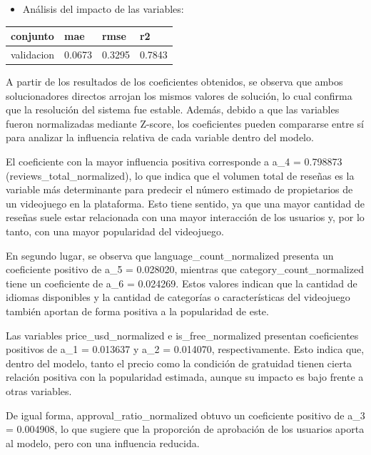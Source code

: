 \documentclass[12pt]{report}
\begin{document}
\begin{itemize}
    \item Análisis del impacto de las variables: 
\end{itemize}

\begin{table}[h]
\centering
\begin{tabular}{|l|l|l|l|}
\hline
\textbf{conjunto} & \textbf{mae} & \textbf{rmse} & \textbf{r2} \\ \hline
validacion & 0.0673 & 0.3295 & 0.7843 \\ \hline
\end{tabular}
\end{table}

A partir de los resultados de los coeficientes obtenidos, se observa que ambos solucionadores directos arrojan los mismos valores de solución, lo cual confirma que la resolución del sistema fue estable. Además, debido a que las variables fueron normalizadas mediante Z-score, los coeficientes pueden compararse entre sí para analizar la influencia relativa de cada variable dentro del modelo.

El coeficiente con la mayor influencia positiva corresponde a a\_4 = 0.798873 (reviews\_total\_normalized), lo que indica que el volumen total de reseñas es la variable más determinante para predecir el número estimado de propietarios de un videojuego en la plataforma. Esto tiene sentido, ya que una mayor cantidad de reseñas suele estar relacionada con una mayor interacción de los usuarios y, por lo tanto, con una mayor popularidad del videojuego.

En segundo lugar, se observa que language\_count\_normalized presenta un coeficiente positivo de a\_5 = 0.028020, mientras que category\_count\_normalized tiene un coeficiente de a\_6 = 0.024269. Estos valores indican que la cantidad de idiomas disponibles y la cantidad de categorías o características del videojuego también aportan de forma positiva a la popularidad de este.

Las variables price\_usd\_normalized e is\_free\_normalized presentan coeficientes positivos de a\_1 = 0.013637 y a\_2 = 0.014070, respectivamente. Esto indica que, dentro del modelo, tanto el precio como la condición de gratuidad tienen cierta relación positiva con la popularidad estimada, aunque su impacto es bajo frente a otras variables. 

De igual forma, approval\_ratio\_normalized obtuvo un coeficiente positivo de a\_3 = 0.004908, lo que sugiere que la proporción de aprobación de los usuarios aporta al modelo, pero con una influencia reducida.
\end{document}
